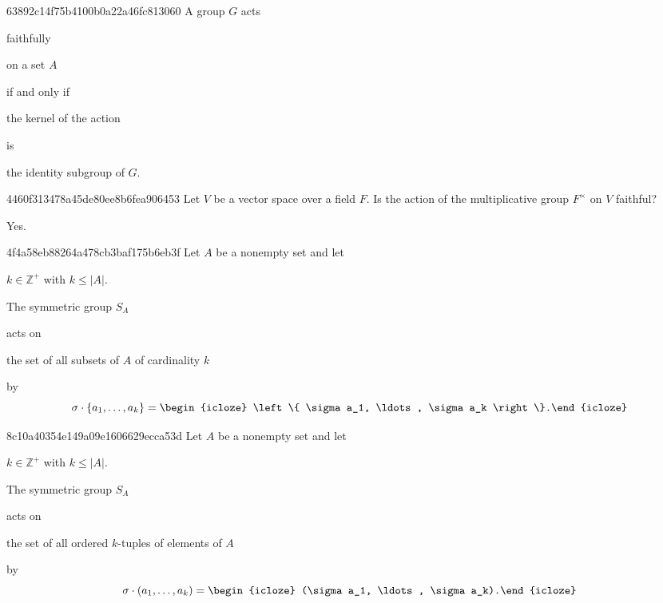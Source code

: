 \begin{note}{63892c14f75b4100b0a22a46fc813060}
    A group \({ G }\) acts \begin{icloze}{3}faithfully\end{icloze} on a set \({ A }\) \begin{icloze}{4}if and only if\end{icloze} \begin{icloze}{2}the kernel of the action\end{icloze} is \begin{icloze}{1}the identity subgroup of \({ G }\).\end{icloze}
\end{note}

\begin{note}{4460f313478a45de80ee8b6fea906453}
    Let \({ V }\) be a vector space over a field \({ F }\).
    Is the action of the multiplicative group \({ F^{\times} }\) on \({ V }\) faithful?

    \begin{cloze}{1}
        Yes.
    \end{cloze}
\end{note}

\begin{note}{4f4a58eb88264a478cb3baf175b6eb3f}
    Let \({ A }\) be a nonempty set and let \begin{icloze}{4}\({ k \in \mathbb Z^{+} }\) with \({ k \leq \left\lvert A \right\rvert }\).\end{icloze}
    \begin{icloze}{3}The symmetric group \({ S_{A} }\)\end{icloze} acts on \begin{icloze}{2}the set of all subsets of \({ A }\) of cardinality \({ k }\)\end{icloze} by
    \[
        \sigma \cdot \left\{ a_1, \ldots, a_k \right\} = \begin{icloze}{1}\left\{ \sigma a_1, \ldots, \sigma a_k \right\}.\end{icloze}
    \]
\end{note}

\begin{note}{8c10a40354e149a09e1606629ecca53d}
    Let \({ A }\) be a nonempty set and let \begin{icloze}{4}\({ k \in \mathbb Z^{+} }\) with \({ k \leq \left\lvert A \right\rvert }\).\end{icloze}
    \begin{icloze}{3}The symmetric group \({ S_{A} }\)\end{icloze} acts on \begin{icloze}{2}the set of all ordered \({ k }\)-tuples of elements of \({ A }\)\end{icloze} by
    \[
        \sigma \cdot (a_1, \ldots, a_k) = \begin{icloze}{1}(\sigma a_1, \ldots, \sigma a_k).\end{icloze}
    \]
\end{note}

